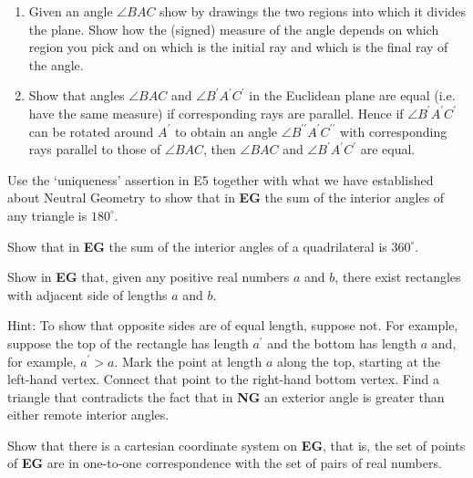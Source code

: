 \begin{question}\hfil
\begin{enumerate}
\item Given an angle $\angle BAC$ show by drawings the two regions into
which it divides the plane. Show how the (signed) measure of the angle
depends on which region you pick and on which is the initial ray and
which is the final ray of the angle.
\item Show that angles $\angle BAC$ and $\angle B^{\prime}A^{\prime}C^{\prime}$
in the Euclidean plane are equal (i.e. have the same measure) if
corresponding rays are parallel. Hence if $\angle
B^{\prime}A^{\prime}C^{\prime}$ can be rotated around $A^{\prime}$ to
obtain an angle $\angle B^{\prime\prime }A^{\prime}C^{\prime\prime}$
with corresponding rays parallel to those of $\angle BAC$, then
$\angle BAC$ and $\angle B^{\prime}A^{\prime}C^{\prime}$ are equal.
\end{enumerate}
\end{question}

\begin{question}
Use the `uniqueness' assertion in E5 together with what we have
established about Neutral Geometry to show that in \textbf{EG} the sum
of the interior angles of any triangle is $180^\circ$.
\end{question}

\begin{question}
Show that in \textbf{EG} the sum of the interior angles of a
quadrilateral is $360^\circ$.
\end{question}

\begin{question}\label{112} 
Show in \textbf{EG} that, given any positive real numbers $a$ and $b$,
there exist rectangles with adjacent side of lengths $a$ and $b$.

Hint: To show that opposite sides are of equal length, suppose
not. For example, suppose the top of the rectangle has length
$a^{\prime}$ and the bottom has length $a$ and, for example,
$a^{\prime}>a$. Mark the point at length $a$ along the top, starting
at the left-hand vertex. Connect that point to the right-hand bottom
vertex. Find a triangle that contradicts the fact that in \textbf{NG}
an exterior angle is greater than either remote interior angles.
\end{question}

\begin{question}
Show that there is a cartesian coordinate system on \textbf{EG}, that
is, the set of points of \textbf{EG} are in one-to-one correspondence
with the set of pairs of real numbers.
\end{question}

